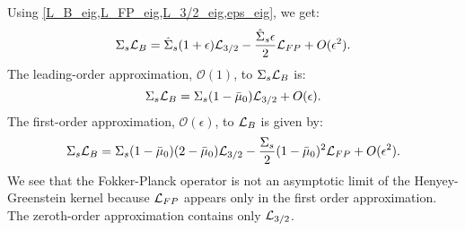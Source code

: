 Using \cref{L_B_eig,L_FP_eig,L_3/2_eig,eps_eig}, we get:
\begin{equation}
\Sigma_s\mc{L}_B = \hat{\Sigma}_s(1+\epsilon) \mc{L}_{3/2} -
\frac{\hat{\Sigma}_s \epsilon}{2} \mc{L}_{FP} + O(\epsilon^2).
\label{HG_approx}
\end{equation}
The leading-order approximation, $\mathcal{O}(1)$, to $\Sigma_s \mathcal{L}_B$ is:
\begin{equation}
\Sigma_s \mathcal{L}_B = \Sigma_s(1-\bar{\mu}_0) \mathcal{L}_{3/2} +O(\epsilon).
\end{equation}
The first-order approximation, $\mathcal{O}(\epsilon)$, to $\mathcal{L}_B$ is given by:
\begin{equation}
\Sigma_s\mathcal{L}_B = \Sigma_s(1-\bar{\mu}_0)(2-\bar{\mu}_0) \mathcal{L}_{3/2} -
\frac{\Sigma_s}{2}(1-\bar{\mu}_0)^2\mathcal{L}_{FP} + O(\epsilon^2).
\end{equation}
We see that the Fokker-Planck operator is not an asymptotic limit of the
Henyey-Greenstein kernel because $\mathcal{L}_{FP}$ appears only in the first order
approximation. The zeroth-order approximation contains only $\mathcal{L}_{3/2}$.

